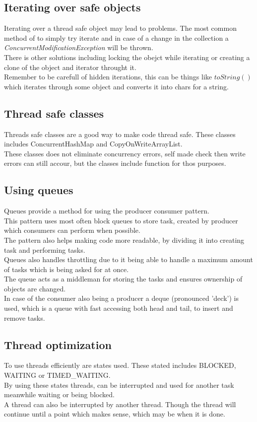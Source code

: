 \documentclass[12pt, a4paper]{article}
\begin{document}
		\subsection{Iterating over safe objects}
			Iterating over a thread safe object may lead to problems. The most common method of to simply try iterate and in case of a change in the collection a \textit{ConcurrentModificationException} will be thrown.\\
			There is other solutions including locking the obejct while iterating or creating a clone of the object and iterator throught it.\\
			Remember to be carefull of hidden iterations, this can be things like $toString()$ which iterates through some object and converts it into chars for a string.
		\subsection{Thread safe classes}
			Threads safe classes are a good way to make code thread safe. These classes includes ConcurrentHashMap and CopyOnWriteArrayList.\\
			These classes does not eliminate concurrency errors, self made check then write errors can still accour, but the classes include function for thos purposes.
		\subsection{Using queues}
			Queues provide a method for using the producer consumer pattern.\\
			This pattern uses most often block queues to store task, created by producer which consumers can perform when possible.\\
			The pattern also helps making code more readable, by dividing it into creating task and performing tasks.\\
			Queues also handles throttling due to it being able to handle a maximum amount of tasks which is being asked for at once.\\
			The queue acts as a middleman for storing the tasks and ensures ownership of objects are changed.\\
			In case of the consumer also being a producer a deque (pronounced 'deck') is used, which is a queue with fast accessing both head and tail, to insert and remove tasks.\\
		\subsection{Thread optimization}
			To use threads efficiently are states used. These stated includes BLOCKED, WAITING or TIMED_WAITING.\\
			By using these states threads, can be interrupted and used for another task meanwhile waiting or being blocked.\\
			A thread can also be interrupted by another thread. Though the thread will continue until a point which makes sense, which may be when it is done.
\end{document}
